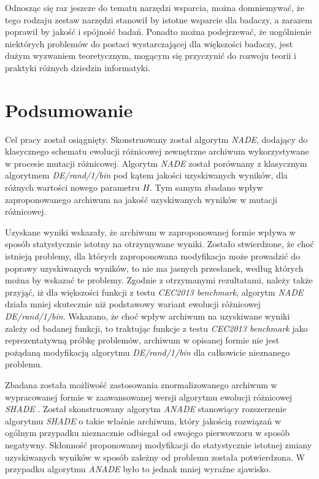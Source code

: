 \documentclass[12pt,a4paper]{report}
\begin{document}
{{{{{{{\begin{description}
\end{description}
}
\par{
Odnosząc się raz jeszcze do tematu narzędzi wsparcia, można domniemywać, że tego rodzaju zestaw narzędzi stanowił by istotne wsparcie dla badaczy, a zarazem poprawił by jakość i spójność badań. Ponadto można podejrzewać, że uogólnienie niektórych problemów do postaci wystarczającej dla większości badaczy, jest dużym wyzwaniem teoretycznym, mogącym się przyczynić do rozwoju teorii i praktyki różnych dziedzin informatyki.
}


\chapter{Podsumowanie}
\par{
Cel pracy został osiągnięty. Skonstruowany został algorytm \emph{NADE}, dodający do klasycznego schematu ewolucji różnicowej zewnętrzne archiwum wykorzystywane w procesie mutacji różnicowej. Algorytm \emph{NADE} został porównany z klasycznym algorytmem \emph{DE/rand/1/bin} pod kątem jakości uzyskiwanych wyników, dla różnych wartości nowego parametru $H$. Tym samym zbadano wpływ zaproponowanego archiwum na jakość uzyskiwanych wyników w mutacji różnicowej.
}
\par{
Uzyskane wyniki wskazały, że archiwum w zaproponowanej formie wpływa w sposób statystycznie istotny na otrzymywane wyniki. Zostało stwierdzone, że choć istnieją problemy, dla których zaproponowana modyfikacja może prowadzić do poprawy uzyskiwanych wyników, to nie ma jasnych przesłanek, według których można by wskazać te problemy. Zgodnie z otrzymanymi rezultatami, należy także przyjąć, iż dla większości funkcji z testu \emph{CEC2013 benchmark}, algorytm \emph{NADE} działa mniej skutecznie niż podstawowy wariant ewolucji różnicowej \emph{DE/rand/1/bin}. Wskazano, że choć wpływ archiwum na uzyskiwane wyniki zależy od badanej funkcji, to traktując funkcje z testu \emph{CEC2013 benchmark} jako reprezentatywną próbkę problemów, archiwum w opisanej formie nie jest pożądaną modyfikacją algorytmu \emph{DE/rand/1/bin} dla całkowicie nieznanego problemu.
}
\par{
Zbadana została możliwość zastosowania znormalizowanego archiwum w wypracowanej formie w zaawansowanej wersji algorytmu ewolucji różnicowej \emph{SHADE} \cite{SHADE}. Został skonstruowany algorytm \emph{ANADE} stanowiący rozszerzenie algorytmu \emph{SHADE} o takie właśnie archiwum, który jakością rozwiązań w ogólnym przypadku nieznacznie odbiegał od swojego pierwowzoru w sposób negatywny. Skłonność proponowanej modyfikacji do statystycznie istotnej zmiany uzyskiwanych wyników w sposób zależny od problemu została potwierdzona. W przypadku algorytmu \emph{ANADE} było to jednak mniej wyraźne zjawisko.
}}}}}}}
\end{document}
